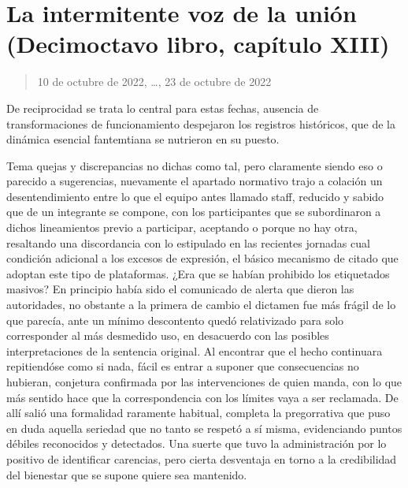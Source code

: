\documentclass[
]{book}
\begin{document}
\hypertarget{la-intermitente-voz-de-la-uniuxf3n-decimoctavo-libro-capuxedtulo-xiii}{%
\section{La intermitente voz de la unión (Decimoctavo libro, capítulo XIII)}\label{la-intermitente-voz-de-la-uniuxf3n-decimoctavo-libro-capuxedtulo-xiii}}

\begin{quote}
10 de octubre de 2022, \ldots, 23 de octubre de 2022
\end{quote}

De reciprocidad se trata lo central para estas fechas, ausencia de transformaciones de funcionamiento despejaron los registros históricos, que de la dinámica esencial fantemtiana se nutrieron en su puesto.

Tema quejas y discrepancias no dichas como tal, pero claramente siendo eso o parecido a sugerencias, nuevamente el apartado normativo trajo a colación un desentendimiento entre lo que el equipo antes llamado staff, reducido y sabido que de un integrante se compone, con los participantes que se subordinaron a dichos lineamientos previo a participar, aceptando o porque no hay otra, resaltando una discordancia con lo estipulado en las recientes jornadas cual condición adicional a los excesos de expresión, el básico mecanismo de citado que adoptan este tipo de plataformas. ¿Era que se habían prohibido los etiquetados masivos? En principio había sido el comunicado de alerta que dieron las autoridades, no obstante a la primera de cambio el dictamen fue más frágil de lo que parecía, ante un mínimo descontento quedó relativizado para solo corresponder al más desmedido uso, en desacuerdo con las posibles interpretaciones de la sentencia original. Al encontrar que el hecho continuara repitiendóse como si nada, fácil es entrar a suponer que consecuencias no hubieran, conjetura confirmada por las intervenciones de quien manda, con lo que más sentido hace que la correspondencia con los límites vaya a ser reclamada. De allí salió una formalidad raramente habitual, completa la pregorrativa que puso en duda aquella seriedad que no tanto se respetó a sí misma, evidenciando puntos débiles reconocidos y detectados. Una suerte que tuvo la administración por lo positivo de identificar carencias, pero cierta desventaja en torno a la credibilidad del bienestar que se supone quiere sea mantenido.
\end{document}
